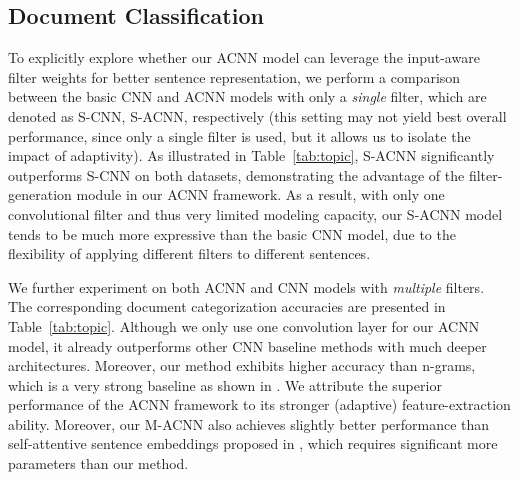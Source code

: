 \documentclass[11pt,a4paper]{article}
\begin{document}
\subsection{Document Classification}
To explicitly explore whether our ACNN model can leverage the input-aware filter weights for better sentence representation, we perform a comparison between the basic CNN and ACNN models with only a \emph{single} filter, which are denoted as S-CNN, S-ACNN, respectively (this setting may not yield best overall performance, since only a single filter is used, but it allows us to isolate the impact of adaptivity). As illustrated in Table~\ref{tab:topic}, S-ACNN significantly outperforms S-CNN on both datasets, demonstrating the advantage of the filter-generation module in our ACNN framework. As a result, with only one convolutional filter and thus very limited modeling capacity, our S-ACNN model tends to be much more expressive than the basic CNN model, due to the flexibility of applying different filters to different sentences.

We further experiment on both ACNN and CNN models with \emph{multiple} filters. The corresponding document categorization accuracies are presented in Table~\ref{tab:topic}. Although we only use one convolution layer for our ACNN model, it already outperforms other CNN baseline methods with much deeper architectures. Moreover, our method exhibits higher accuracy than n-grams, which is a very strong baseline as shown in \cite{zhang2015character}. We attribute the superior performance of the ACNN framework to its stronger (adaptive) feature-extraction ability. Moreover, our M-ACNN also achieves slightly better performance than self-attentive sentence embeddings proposed in \citet{lin2017structured}, which requires significant more parameters than our method.
\end{document}

